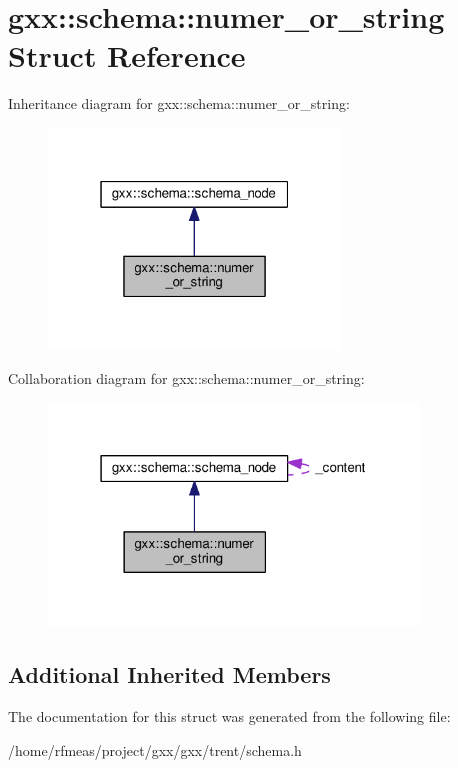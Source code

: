 \hypertarget{structgxx_1_1schema_1_1numer__or__string}{}\section{gxx\+:\+:schema\+:\+:numer\+\_\+or\+\_\+string Struct Reference}
\label{structgxx_1_1schema_1_1numer__or__string}


Inheritance diagram for gxx\+:\+:schema\+:\+:numer\+\_\+or\+\_\+string\+:
\nopagebreak
\begin{figure}[H]
\begin{center}
\leavevmode
\includegraphics[width=220pt]{structgxx_1_1schema_1_1numer__or__string__inherit__graph}
\end{center}
\end{figure}


Collaboration diagram for gxx\+:\+:schema\+:\+:numer\+\_\+or\+\_\+string\+:
\nopagebreak
\begin{figure}[H]
\begin{center}
\leavevmode
\includegraphics[width=279pt]{structgxx_1_1schema_1_1numer__or__string__coll__graph}
\end{center}
\end{figure}
\subsection*{Additional Inherited Members}


The documentation for this struct was generated from the following file\+:\begin{DoxyCompactItemize}
\item 
/home/rfmeas/project/gxx/gxx/trent/schema.\+h\end{DoxyCompactItemize}
